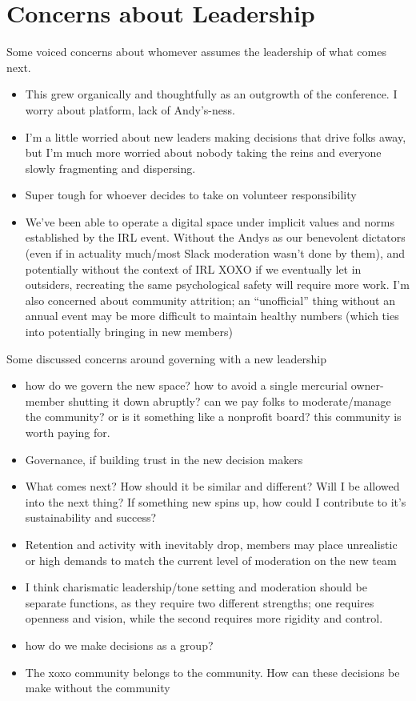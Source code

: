 \documentclass[
]{book}
\providecommand{\tightlist}{%
  \setlength{\itemsep}{0pt}\setlength{\parskip}{0pt}}
\begin{document}
\section{Concerns about Leadership}\label{concerns-about-leadership}

Some voiced concerns about whomever assumes the leadership of what comes next.

\begin{itemize}
\tightlist
\item
  This grew organically and thoughtfully as an outgrowth of the conference. I worry about platform, lack of Andy's-ness.
\item
  I'm a little worried about new leaders making decisions that drive folks away, but I'm much more worried about nobody taking the reins and everyone slowly fragmenting and dispersing.
\item
  Super tough for whoever decides to take on volunteer responsibility
\item
  We've been able to operate a digital space under implicit values and norms established by the IRL event. Without the Andys as our benevolent dictators (even if in actuality much/most Slack moderation wasn't done by them), and potentially without the context of IRL XOXO if we eventually let in outsiders, recreating the same psychological safety will require more work. I'm also concerned about community attrition; an ``unofficial'' thing without an annual event may be more difficult to maintain healthy numbers (which ties into potentially bringing in new members)
\end{itemize}

Some discussed concerns around governing with a new leadership

\begin{itemize}
\tightlist
\item
  how do we govern the new space? how to avoid a single mercurial owner-member shutting it down abruptly? can we pay folks to moderate/manage the community? or is it something like a nonprofit board? this community is worth paying for.
\item
  Governance, if building trust in the new decision makers
\item
  What comes next? How should it be similar and different? Will I be allowed into the next thing? If something new spins up, how could I contribute to it's sustainability and success?
\item
  Retention and activity with inevitably drop, members may place unrealistic or high demands to match the current level of moderation on the new team
\item
  I think charismatic leadership/tone setting and moderation should be separate functions, as they require two different strengths; one requires openness and vision, while the second requires more rigidity and control.
\item
  how do we make decisions as a group?
\item
  The xoxo community belongs to the community. How can these decisions be make without the community
\end{itemize}
\end{document}

